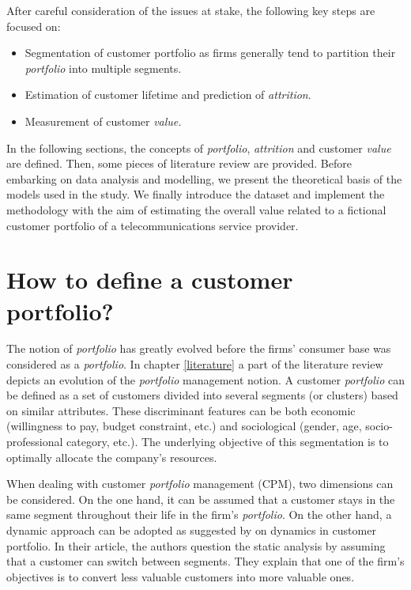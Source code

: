\documentclass[
]{book}
\providecommand{\tightlist}{%
  \setlength{\itemsep}{0pt}\setlength{\parskip}{0pt}}
\begin{document}
After careful consideration of the issues at stake, the following key steps are focused on:

\begin{itemize}
\tightlist
\item
  Segmentation of customer portfolio as firms generally tend to partition their \emph{portfolio} into multiple segments.
\item
  Estimation of customer lifetime and prediction of \emph{attrition}.
\item
  Measurement of customer \emph{value.}
\end{itemize}

In the following sections, the concepts of \emph{portfolio}, \emph{attrition} and customer \emph{value} are defined. Then, some pieces of literature review are provided. Before embarking on data analysis and modelling, we present the theoretical basis of the models used in the study. We finally introduce the dataset and implement the methodology with the aim of estimating the overall value related to a fictional customer portfolio of a telecommunications service provider.

\hypertarget{portfoliodef}{%
\section{How to define a customer portfolio?}\label{portfoliodef}}

The notion of \emph{portfolio} has greatly evolved before the firms' consumer base was considered as a \emph{portfolio}. In chapter \ref{literature} a part of the literature review depicts an evolution of the \emph{portfolio} management notion. A customer \emph{portfolio} can be defined as a set of customers divided into several segments (or clusters) based on similar attributes. These discriminant features can be both economic (willingness to pay, budget constraint, etc.) and sociological (gender, age, socio-professional category, etc.). The underlying objective of this segmentation is to optimally allocate the company's resources.

When dealing with customer \emph{portfolio} management (CPM), two dimensions can be considered. On the one hand, it can be assumed that a customer stays in the same segment throughout their life in the firm's \emph{portfolio}. On the other hand, a dynamic approach can be adopted as suggested by \citet{MANAGING_DYNAMICS_CUSTOMER_PORTFOLIO} on dynamics in customer portfolio. In their article, the authors question the static analysis by assuming that a customer can switch between segments. They explain that one of the firm's objectives is to convert less valuable customers into more valuable ones.
\end{document}
